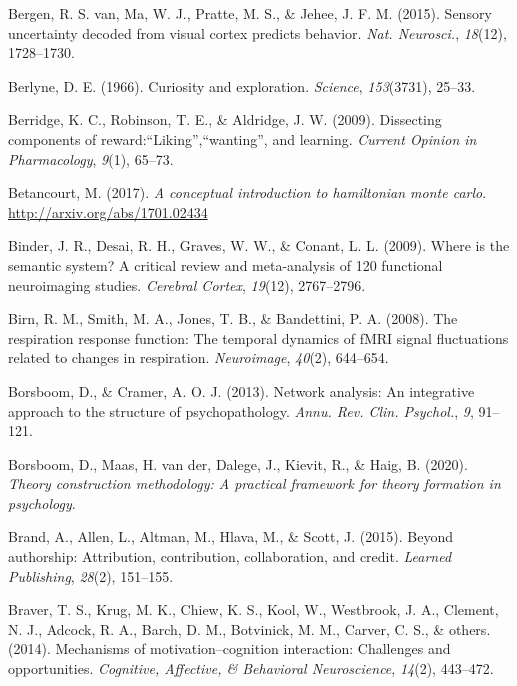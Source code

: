 \documentclass[12pt,american,a4paper,oneside,]{memoir} %
\begin{document}
\leavevmode\hypertarget{ref-Van_Bergen2015-kl}{}%
Bergen, R. S. van, Ma, W. J., Pratte, M. S., \& Jehee, J. F. M. (2015). Sensory uncertainty decoded from visual cortex predicts behavior. \emph{Nat. Neurosci.}, \emph{18}(12), 1728--1730.

\leavevmode\hypertarget{ref-berlyne1966curiosity}{}%
Berlyne, D. E. (1966). Curiosity and exploration. \emph{Science}, \emph{153}(3731), 25--33.

\leavevmode\hypertarget{ref-berridge2009dissecting}{}%
Berridge, K. C., Robinson, T. E., \& Aldridge, J. W. (2009). Dissecting components of reward:``Liking'',``wanting'', and learning. \emph{Current Opinion in Pharmacology}, \emph{9}(1), 65--73.

\leavevmode\hypertarget{ref-Betancourt2017-rj}{}%
Betancourt, M. (2017). \emph{A conceptual introduction to hamiltonian monte carlo}. \url{http://arxiv.org/abs/1701.02434}

\leavevmode\hypertarget{ref-binder2009semantic}{}%
Binder, J. R., Desai, R. H., Graves, W. W., \& Conant, L. L. (2009). Where is the semantic system? A critical review and meta-analysis of 120 functional neuroimaging studies. \emph{Cerebral Cortex}, \emph{19}(12), 2767--2796.

\leavevmode\hypertarget{ref-Birn2008-ti}{}%
Birn, R. M., Smith, M. A., Jones, T. B., \& Bandettini, P. A. (2008). The respiration response function: The temporal dynamics of fMRI signal fluctuations related to changes in respiration. \emph{Neuroimage}, \emph{40}(2), 644--654.

\leavevmode\hypertarget{ref-Borsboom2013-wb}{}%
Borsboom, D., \& Cramer, A. O. J. (2013). Network analysis: An integrative approach to the structure of psychopathology. \emph{Annu. Rev. Clin. Psychol.}, \emph{9}, 91--121.

\leavevmode\hypertarget{ref-Borsboom2020-xg}{}%
Borsboom, D., Maas, H. van der, Dalege, J., Kievit, R., \& Haig, B. (2020). \emph{Theory construction methodology: A practical framework for theory formation in psychology}.

\leavevmode\hypertarget{ref-brand2015beyond}{}%
Brand, A., Allen, L., Altman, M., Hlava, M., \& Scott, J. (2015). Beyond authorship: Attribution, contribution, collaboration, and credit. \emph{Learned Publishing}, \emph{28}(2), 151--155.

\leavevmode\hypertarget{ref-braver2014mechanisms}{}%
Braver, T. S., Krug, M. K., Chiew, K. S., Kool, W., Westbrook, J. A., Clement, N. J., Adcock, R. A., Barch, D. M., Botvinick, M. M., Carver, C. S., \& others. (2014). Mechanisms of motivation--cognition interaction: Challenges and opportunities. \emph{Cognitive, Affective, \& Behavioral Neuroscience}, \emph{14}(2), 443--472.
\end{document}

